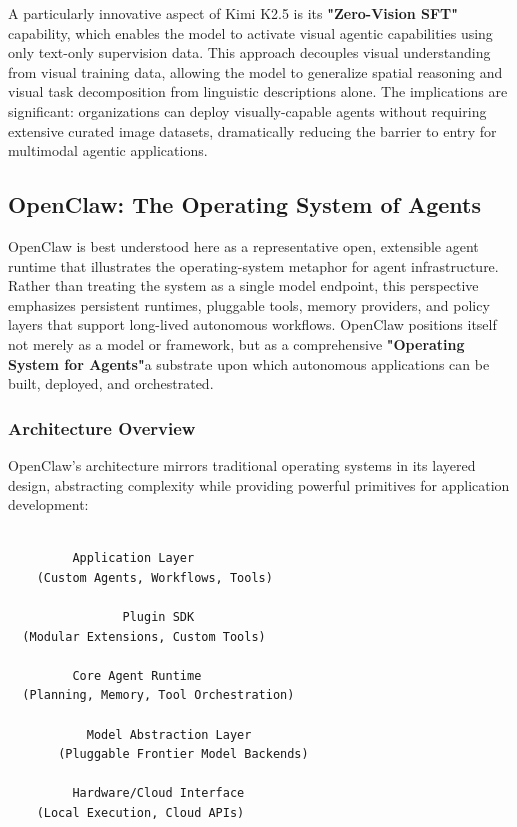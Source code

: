 A particularly innovative aspect of Kimi K2.5 is its \textbf{"Zero-Vision SFT"} capability, which enables the model to activate visual agentic capabilities using only text-only supervision data. This approach decouples visual understanding from visual training data, allowing the model to generalize spatial reasoning and visual task decomposition from linguistic descriptions alone. The implications are significant: organizations can deploy visually-capable agents without requiring extensive curated image datasets, dramatically reducing the barrier to entry for multimodal agentic applications.

\subsection{OpenClaw: The Operating System of Agents}

OpenClaw is best understood here as a representative open, extensible agent runtime that illustrates the operating-system metaphor for agent infrastructure. Rather than treating the system as a single model endpoint, this perspective emphasizes persistent runtimes, pluggable tools, memory providers, and policy layers that support long-lived autonomous workflows. OpenClaw positions itself not merely as a model or framework, but as a comprehensive \textbf{"Operating System for Agents"}a substrate upon which autonomous applications can be built, deployed, and orchestrated.

\subsubsection{Architecture Overview}

OpenClaw's architecture mirrors traditional operating systems in its layered design, abstracting complexity while providing powerful primitives for application development:

\begin{lstlisting}

         Application Layer               
    (Custom Agents, Workflows, Tools)    

                Plugin SDK                 
  (Modular Extensions, Custom Tools)     

         Core Agent Runtime              
  (Planning, Memory, Tool Orchestration) 

           Model Abstraction Layer         
       (Pluggable Frontier Model Backends)   

         Hardware/Cloud Interface        
    (Local Execution, Cloud APIs)        

\end{lstlisting}

